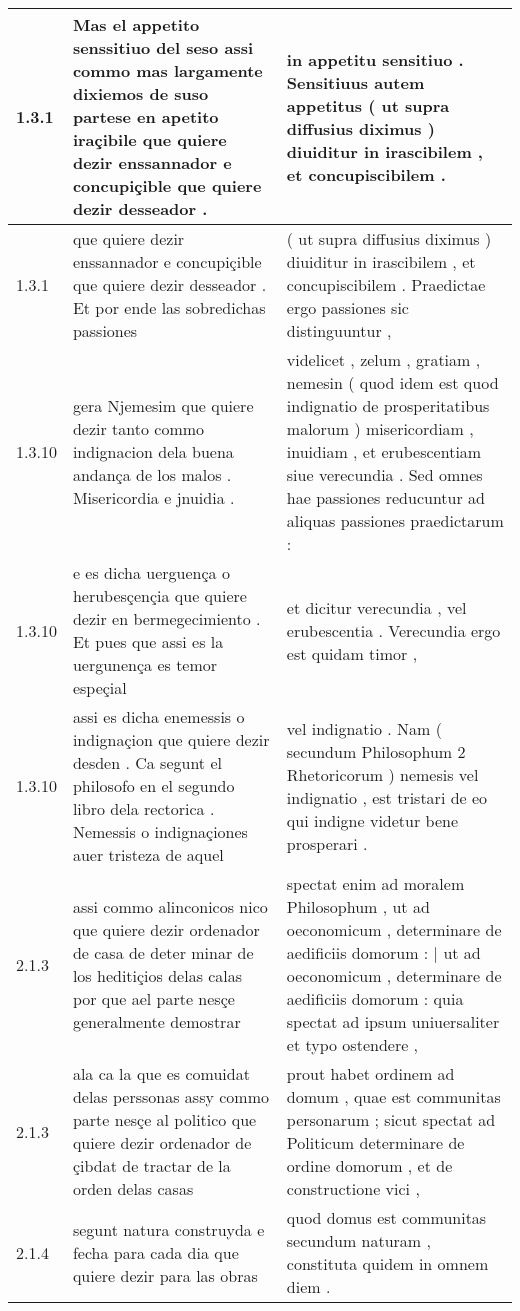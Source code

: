 \begin{tabular}{|p{1cm}|p{6.5cm}|p{6.5cm}|}
1.3.1 & Mas el appetito senssitiuo del seso assi commo mas largamente dixiemos de suso partese en apetito iraçibile que quiere dezir enssannador e concupiçible que quiere dezir desseador . & in appetitu sensitiuo . Sensitiuus autem appetitus ( ut supra diffusius diximus ) diuiditur in irascibilem , et concupiscibilem . \\\hline
1.3.1 & que quiere dezir enssannador e concupiçible que quiere dezir desseador . Et por ende las sobredichas passiones & ( ut supra diffusius diximus ) diuiditur in irascibilem , et concupiscibilem . Praedictae ergo passiones sic distinguuntur , \\\hline
1.3.10 & gera Njemesim que quiere dezir tanto commo indignacion dela buena andança de los malos . Misericordia e jnuidia . & videlicet , zelum , gratiam , nemesin ( quod idem est quod indignatio de prosperitatibus malorum ) misericordiam , inuidiam , et erubescentiam siue verecundia . Sed omnes hae passiones reducuntur ad aliquas passiones praedictarum : \\\hline
1.3.10 & e es dicha uerguença o herubesçençia que quiere dezir en bermegecimiento . Et pues que assi es la uergunença es temor espeçial & et dicitur verecundia , vel erubescentia . Verecundia ergo est quidam timor , \\\hline
1.3.10 & assi es dicha enemessis o indignaçion que quiere dezir desden . Ca segunt el philosofo en el segundo libro dela rectorica . Nemessis o indignaçiones auer tristeza de aquel & vel indignatio . Nam ( secundum Philosophum 2 Rhetoricorum ) nemesis vel indignatio , est tristari de eo qui indigne videtur bene prosperari . \\\hline
2.1.3 & assi commo alinconicos nico que quiere dezir ordenador de casa de deter minar de los heditiçios delas calas por que ael parte nesçe generalmente demostrar & spectat enim ad moralem Philosophum , ut ad oeconomicum , determinare de aedificiis domorum : | ut ad oeconomicum , determinare de aedificiis domorum : quia spectat ad ipsum uniuersaliter et typo ostendere , \\\hline
2.1.3 & ala ca la que es comuidat delas perssonas assy commo parte nesçe al politico que quiere dezir ordenador de çibdat de tractar de la orden delas casas & prout habet ordinem ad domum , quae est communitas personarum ; sicut spectat ad Politicum determinare de ordine domorum , et de constructione vici , \\\hline
2.1.4 & segunt natura construyda e fecha para cada dia que quiere dezir para las obras & quod domus est communitas secundum naturam , constituta quidem in omnem diem . \\\hline

\end{tabular}
